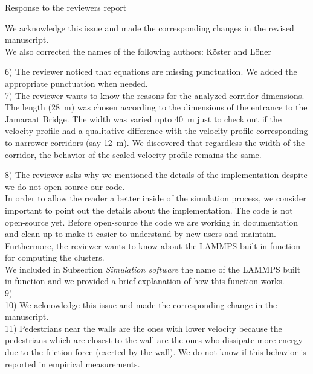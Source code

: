 \documentclass[a4paper,12pt]{letter}
\begin{document}
\begin{letter}{Response to the reviewers report}
{We acknowledge this issue and made the corresponding changes in the
revised manuscript. \\

We also corrected the names of the following authors: K\"oster and L\"oner  

6) The reviewer noticed that equations are missing punctuation. We added the appropriate punctuation when needed. \\

7) The reviewer wants to know the reasons for the analyzed corridor dimensions. 
\\

The length (28~m) was chosen according to the dimensions of the entrance to the Jamaraat Bridge. 
The width was varied upto 40~m just to check out if the velocity profile had a qualitative difference with the velocity profile corresponding to narrower corridors (say 12~m). We discovered that regardless the width of the corridor, the behavior of the scaled velocity profile remains the same. 

8) The reviewer asks why we mentioned the details of the implementation despite 
we do not open-source our code. \\

In order to allow the reader a better inside of the simulation process, we 
consider important to point out the details about the implementation. The code is not open-source yet.
Before open-source the code we are working in documentation and clean up to make it easier to understand by new users and maintain.  \\

Furthermore, the reviewer wants to know about the LAMMPS built in function for 
computing the clusters. \\

We included in Subsection \textit{Simulation software} the name of the LAMMPS 
built in function and we provided a brief explanation of how this function works. \\ 

9) --- \\

10) We acknowledge this issue and made the corresponding change in the 
manuscript.\\

11) Pedestrians near the walls are the ones with lower velocity because the pedestrians which are closest to the wall are the ones who dissipate more energy due to the friction force (exerted by the wall). We do not know if this behavior is reported in empirical measurements.  

}
\end{letter}
\end{document}
